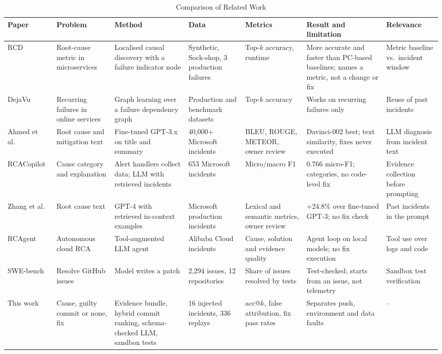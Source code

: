 \documentclass[12pt,onecolumn,draftclsnofoot]{IEEEtran}
\begin{document}
\begin{table}[!t]
\caption{Comparison of Related Work}
\label{tab:related}
\centering
\scriptsize
\setlength{\tabcolsep}{3pt}
\renewcommand{\arraystretch}{1.15}
\begin{tabularx}{\textwidth}{L{1.8cm}L{1.8cm}L{2.0cm}L{1.9cm}L{1.5cm}Y L{1.8cm}}
\toprule
\textbf{Paper} & \textbf{Problem} & \textbf{Method} & \textbf{Data} & \textbf{Metrics} & \textbf{Result and limitation} & \textbf{Relevance} \\
\midrule
RCD~\cite{ikram2022rcd} & Root-cause metric in microservices & Localised causal discovery with a failure indicator node & Synthetic, Sock-shop, 3 production failures & Top-$k$ accuracy, runtime & More accurate and faster than PC-based baselines; names a metric, not a change or fix & Metric baseline vs.\ incident window \\
DejaVu~\cite{li2022dejavu} & Recurring failures in online services & Graph learning over a failure dependency graph & Production and benchmark datasets & Top-$k$ accuracy & Works on recurring failures only & Reuse of past incidents \\
Ahmed et al.~\cite{ahmed2023recommending} & Root cause and mitigation text & Fine-tuned GPT-3.x on title and summary & 40,000+ Microsoft incidents & BLEU, ROUGE, METEOR, owner review & Davinci-002 best; text similarity, fixes never executed & LLM diagnosis from incident text \\
RCACopilot~\cite{chen2024rcacopilot} & Cause category and explanation & Alert handlers collect data; LLM with retrieved incidents & 653 Microsoft incidents & Micro/macro F1 & 0.766 micro-F1; categories, no code-level fix & Evidence collection before prompting \\
Zhang et al.~\cite{zhang2024icl} & Root cause text & GPT-4 with retrieved in-context examples & Microsoft production incidents & Lexical and semantic metrics, owner review & +24.8\% over fine-tuned GPT-3; no fix check & Past incidents in the prompt \\
RCAgent~\cite{wang2024rcagent} & Autonomous cloud RCA & Tool-augmented LLM agent & Alibaba Cloud incidents & Cause, solution and evidence quality & Agent loop on local models; no fix execution & Tool use over logs and code \\
SWE-bench~\cite{jimenez2024swebench} & Resolve GitHub issues & Model writes a patch & 2,294 issues, 12 repositories & Share of issues resolved by tests & Test-checked; starts from an issue, not telemetry & Sandbox test verification \\
\midrule
This work & Cause, guilty commit or none, fix & Evidence bundle, hybrid commit ranking, schema-checked LLM, sandbox tests & 16 injected incidents, 336 replays & acc@$k$, false attribution, fix pass rates & Separates push, environment and data faults & -- \\
\bottomrule
\end{tabularx}
\end{table}
\end{document}
